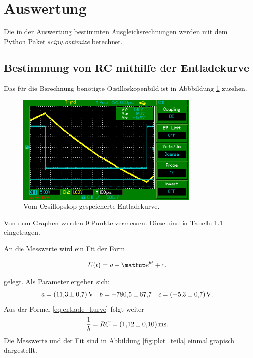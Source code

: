 \section{Auswertung}
Die in der Auswertung bestimmten Ausgleichsrechnungen werden mit
dem Python Paket \emph{scipy.optimize} berechnet.

\subsection{Bestimmung von RC mithilfe der Entladekurve}

Das für die Berechnung benötigte Ozsilloskopenbild ist in Abbbildung \ref{fig:entladekurve} zusehen.

\begin{figure}
  \includegraphics[width=0.8\textwidth]{pics/bilda_508hz.png}
  \caption{Vom Ozsillopskop gespeicherte Entladekurve.}
  \label{fig:entladekurve}
\end{figure}

Von dem Graphen wurden $9$ Punkte vermessen.
Diese sind in Tabelle \ref{} eingetragen.


An die Messwerte wird ein Fit der Form

\begin{equation*}
  U(t)=a+\map{e}^{bt}+c.
\end{equation*}

gelegt.
Als Parameter ergeben sich:
\begin{equation}
  \label{eq:parameter_teila}
a=\SI{11.3\pm0.7}{\volt} \quad b=\num{-780.5\pm67.7} \quad c=\SI{-5.3\pm0.7}{\volt}.
\end{equation}
Aus der Formel  \eqref{eq:entlade_kurve} folgt weiter
\begin{equation}
  \frac{1}{b}=RC=\SI{1.12\pm0.1}{\milli\second}.
\end{equation}
Die Messwerte und der Fit sind in Abbildung \ref{fig:plot_teila} einmal grapisch
dargestellt.

